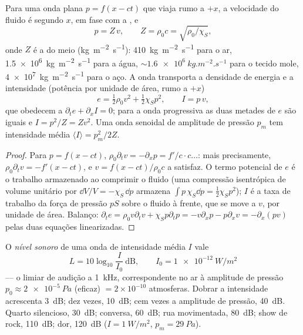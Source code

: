 \begin{proposition}\label{prop:b2:sound-waves:plane}
Para uma onda plana $p = f(x - ct)$ que viaja rumo a $+x$, a velocidade do
fluido é segundo $x$, em fase com a , e
\[
p = Z\,v , \qquad Z = \rho_0c = \sqrt{\rho_0/\chi_S} ,
\]
onde $Z$ é a \emph{} do meio
(\unit{kg.m^{-2}.s^{-1}}): \qty{410}{kg.m^{-2}.s^{-1}} para o ar, \qty{1.5e6}{kg.m^{-2}.s^{-1}}
para a água, $\sim\qty{1.6e6}{kg.m^{-2}.s^{-1}}$ para o tecido mole,
\qty{4e7}{kg.m^{-2}.s^{-1}} para o aço. A onda transporta a densidade de energia e
a intensidade (potência por unidade de área, rumo a $+x$)
\[
e = \tfrac12\rho_0v^2 + \tfrac12\chi_Sp^2 , \qquad I = p\,v ,
\]
que obedecem a $\partial_te + \partial_xI = 0$; para a onda progressiva as duas
metades de $e$ são iguais e $I = p^2/Z = Zv^2$. Uma onda senoidal de
amplitude de pressão $p_m$ tem intensidade média $\langle I\rangle = p_m^2/2Z$.
\end{proposition}

\begin{proof}
Para $p = f(x - ct)$, $\rho_0\partial_tv = -\partial_xp = f'/c\cdot c\dots$: mais precisamente,
$\rho_0\partial_tv = -f'(x - ct)$, e $v = f(x - ct)/\rho_0c$ a satisfaz. O
termo potencial de $e$ é o trabalho armazenado ao comprimir o fluido
(uma compressão isentrópica de volume unitário por $\dd V/V = -\chi_S\,\dd p$
armazena $\int p\,\chi_S\dd p = \tfrac12\chi_Sp^2$); $I$ é a taxa de trabalho da
força de pressão $pS$ sobre o fluido à frente, que se move a $v$, por unidade de área.
Balanço: $\partial_te = \rho_0v\partial_tv + \chi_Sp\partial_tp = -v\partial_xp - p\partial_xv =
-\partial_x(pv)$ pelas duas equações linearizadas.
\end{proof}

\begin{definition}\label{def:b2:sound-waves:decibel}
O \emph{nível sonoro} de uma onda de intensidade média $I$ vale
\[
L = 10\log_{10}\frac I{I_0} \ \text{dB} , \qquad I_0 = \qty{1e-12}{W/m^2}
\]
--- o limiar de audição a \qty{1}{kHz}, correspondente no ar à
amplitude de pressão $p_0 \approx \qty{2e-5}{Pa}$ (eficaz) $= 2 \times 10^{-10}$
atmosferas. Dobrar a intensidade acrescenta \qty{3}{dB}; dez vezes, \qty{10}{dB};
cem vezes a amplitude de pressão, \qty{40}{dB}. Quarto silencioso,
\qty{30}{dB}; conversa, \qty{60}{dB}; rua movimentada, \qty{80}{dB}; show de rock,
\qty{110}{dB}; dor, \qty{120}{dB} ($I = \qty{1}{W/m^2}$, $p_m = \qty{29}{Pa}$).
\end{definition}

